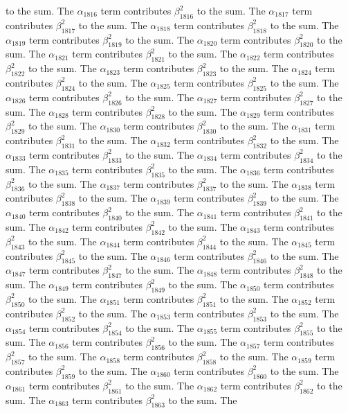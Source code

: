 \begin{lemma}
to the sum. The $\alpha_{1816}$ term contributes $\beta_{1816}^{2}$ to the sum. The $\alpha_{1817}$ term contributes $\beta_{1817}^{2}$ to the sum. The $\alpha_{1818}$ term contributes $\beta_{1818}^{2}$ to the sum. The $\alpha_{1819}$ term contributes $\beta_{1819}^{2}$ to the sum. The $\alpha_{1820}$ term contributes $\beta_{1820}^{2}$ to the sum. The $\alpha_{1821}$ term contributes $\beta_{1821}^{2}$ to the sum. The $\alpha_{1822}$ term contributes $\beta_{1822}^{2}$ to the sum. The $\alpha_{1823}$ term contributes $\beta_{1823}^{2}$ to the sum. The $\alpha_{1824}$ term contributes $\beta_{1824}^{2}$ to the sum. The $\alpha_{1825}$ term contributes $\beta_{1825}^{2}$ to the sum. The $\alpha_{1826}$ term contributes $\beta_{1826}^{2}$ to the sum. The $\alpha_{1827}$ term contributes $\beta_{1827}^{2}$ to the sum. The $\alpha_{1828}$ term contributes $\beta_{1828}^{2}$ to the sum. The $\alpha_{1829}$ term contributes $\beta_{1829}^{2}$ to the sum. The $\alpha_{1830}$ term contributes $\beta_{1830}^{2}$ to the sum. The $\alpha_{1831}$ term contributes $\beta_{1831}^{2}$ to the sum. The $\alpha_{1832}$ term contributes $\beta_{1832}^{2}$ to the sum. The $\alpha_{1833}$ term contributes $\beta_{1833}^{2}$ to the sum. The $\alpha_{1834}$ term contributes $\beta_{1834}^{2}$ to the sum. The $\alpha_{1835}$ term contributes $\beta_{1835}^{2}$ to the sum. The $\alpha_{1836}$ term contributes $\beta_{1836}^{2}$ to the sum. The $\alpha_{1837}$ term contributes $\beta_{1837}^{2}$ to the sum. The $\alpha_{1838}$ term contributes $\beta_{1838}^{2}$ to the sum. The $\alpha_{1839}$ term contributes $\beta_{1839}^{2}$ to the sum. The $\alpha_{1840}$ term contributes $\beta_{1840}^{2}$ to the sum. The $\alpha_{1841}$ term contributes $\beta_{1841}^{2}$ to the sum. The $\alpha_{1842}$ term contributes $\beta_{1842}^{2}$ to the sum. The $\alpha_{1843}$ term contributes $\beta_{1843}^{2}$ to the sum. The $\alpha_{1844}$ term contributes $\beta_{1844}^{2}$ to the sum. The $\alpha_{1845}$ term contributes $\beta_{1845}^{2}$ to the sum. The $\alpha_{1846}$ term contributes $\beta_{1846}^{2}$ to the sum. The $\alpha_{1847}$ term contributes $\beta_{1847}^{2}$ to the sum. The $\alpha_{1848}$ term contributes $\beta_{1848}^{2}$ to the sum. The $\alpha_{1849}$ term contributes $\beta_{1849}^{2}$ to the sum. The $\alpha_{1850}$ term contributes $\beta_{1850}^{2}$ to the sum. The $\alpha_{1851}$ term contributes $\beta_{1851}^{2}$ to the sum. The $\alpha_{1852}$ term contributes $\beta_{1852}^{2}$ to the sum. The $\alpha_{1853}$ term contributes $\beta_{1853}^{2}$ to the sum. The $\alpha_{1854}$ term contributes $\beta_{1854}^{2}$ to the sum. The $\alpha_{1855}$ term contributes $\beta_{1855}^{2}$ to the sum. The $\alpha_{1856}$ term contributes $\beta_{1856}^{2}$ to the sum. The $\alpha_{1857}$ term contributes $\beta_{1857}^{2}$ to the sum. The $\alpha_{1858}$ term contributes $\beta_{1858}^{2}$ to the sum. The $\alpha_{1859}$ term contributes $\beta_{1859}^{2}$ to the sum. The $\alpha_{1860}$ term contributes $\beta_{1860}^{2}$ to the sum. The $\alpha_{1861}$ term contributes $\beta_{1861}^{2}$ to the sum. The $\alpha_{1862}$ term contributes $\beta_{1862}^{2}$ to the sum. The $\alpha_{1863}$ term contributes $\beta_{1863}^{2}$ to the sum. The 
\end{lemma}
